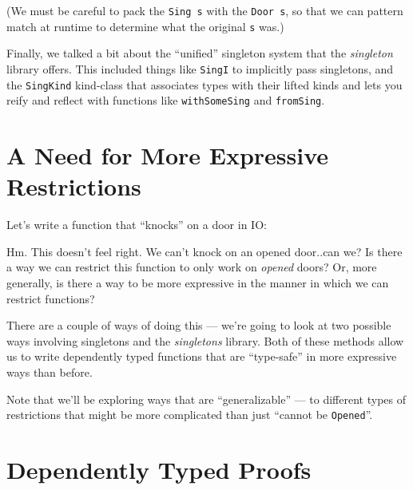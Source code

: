 \documentclass[]{article}
\newenvironment{Shaded}{}{}
\newcommand{\DataTypeTok}[1]{\textcolor[rgb]{0.56,0.13,0.00}{#1}}
\newcommand{\FunctionTok}[1]{\textcolor[rgb]{0.02,0.16,0.49}{#1}}
\newcommand{\NormalTok}[1]{#1}
\newcommand{\OtherTok}[1]{\textcolor[rgb]{0.00,0.44,0.13}{#1}}
\newcommand{\StringTok}[1]{\textcolor[rgb]{0.25,0.44,0.63}{#1}}
\begin{document}
(We must be careful to pack the \texttt{Sing\ s} with the \texttt{Door\ s}, so
that we can pattern match at runtime to determine what the original \texttt{s}
was.)

Finally, we talked a bit about the ``unified'' singleton system that the
\emph{singleton} library offers. This included things like \texttt{SingI} to
implicitly pass singletons, and the \texttt{SingKind} kind-class that associates
types with their lifted kinds and lets you reify and reflect with functions like
\texttt{withSomeSing} and \texttt{fromSing}.

\hypertarget{a-need-for-more-expressive-restrictions}{%
\section{A Need for More Expressive
Restrictions}\label{a-need-for-more-expressive-restrictions}}

Let's write a function that ``knocks'' on a door in IO:

\begin{Shaded}
\end{Shaded}

Hm. This doesn't feel right. We can't knock on an opened door..can we? Is there
a way we can restrict this function to only work on \emph{opened} doors? Or,
more generally, is there a way to be more expressive in the manner in which we
can restrict functions?

There are a couple of ways of doing this --- we're going to look at two possible
ways involving singletons and the \emph{singletons} library. Both of these
methods allow us to write dependently typed functions that are ``type-safe'' in
more expressive ways than before.

Note that we'll be exploring ways that are ``generalizable'' --- to different
types of restrictions that might be more complicated than just ``cannot be
\texttt{\textquotesingle{}Opened}''.

\hypertarget{dependently-typed-proofs}{%
\section{Dependently Typed Proofs}\label{dependently-typed-proofs}}
\end{document}
